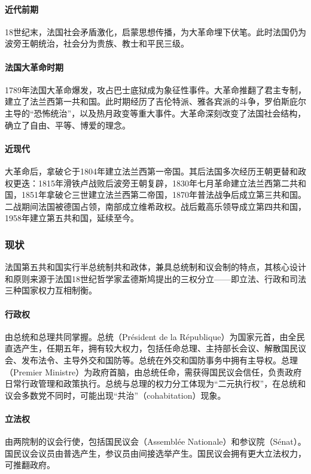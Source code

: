 \paragraph{近代前期} 18世纪末，法国社会矛盾激化，启蒙思想传播，为大革命埋下伏笔。此时法国仍为波旁王朝统治，社会分为贵族、教士和平民三级。

\paragraph{法国大革命时期} 1789年法国大革命爆发，攻占巴士底狱成为象征性事件。大革命推翻了君主专制，建立了法兰西第一共和国。此时期经历了吉伦特派、雅各宾派的斗争，罗伯斯庇尔主导的“恐怖统治”，以及热月政变等重大事件。大革命深刻改变了法国社会结构，确立了自由、平等、博爱的理念。

\paragraph{近现代} 大革命后，拿破仑于1804年建立法兰西第一帝国。其后法国多次经历王朝更替和政权更迭：1815年滑铁卢战败后波旁王朝复辟，1830年七月革命建立法兰西第二共和国，1851年拿破仑三世建立法兰西第二帝国，1870年普法战争后成立第三共和国。二战期间法国被德国占领，南部成立维希政权。战后戴高乐领导成立第四共和国，1958年建立第五共和国，延续至今。

\subsubsection{现状}

法国第五共和国实行半总统制共和政体，兼具总统制和议会制的特点，其核心设计和原则来源于法国18世纪哲学家孟德斯鸠提出的三权分立——即立法、行政和司法三种国家权力互相制衡。

\paragraph{行政权} 由总统和总理共同掌握。总统（Président de la République）为国家元首，由全民直选产生，任期五年，拥有较大权力，包括任命总理、主持部长会议、解散国民议会、发布法令、主导外交和国防等。总统在外交和国防事务中拥有主导权。总理（Premier Ministre）为政府首脑，由总统任命，需获得国民议会信任，负责政府日常行政管理和政策执行。总统与总理的权力分工体现为“二元执行权”，在总统和议会多数党不同时，可能出现“共治”（cohabitation）现象。

\paragraph{立法权} 由两院制的议会行使，包括国民议会（Assemblée Nationale）和参议院（Sénat）。国民议会议员由普选产生，参议员由间接选举产生。国民议会拥有更大立法权力，可推翻政府。

